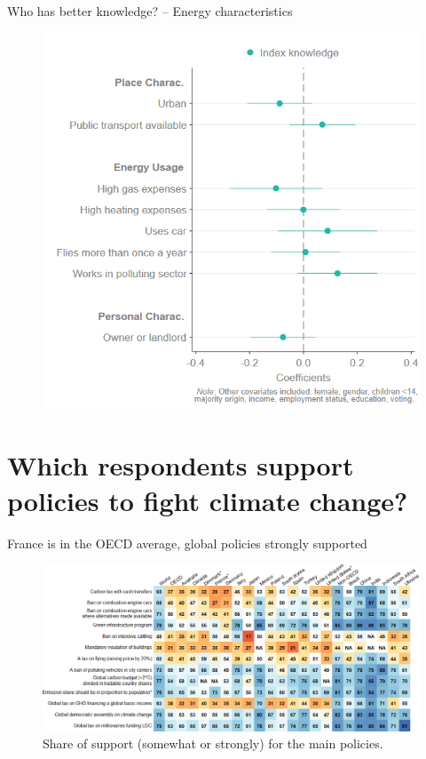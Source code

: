 \begin{framefont}{\small}
\begin{frame}{Who has better knowledge? -- Energy characteristics}
\begin{figure}
	\includegraphics[width=.5\paperwidth]{../figures/FR/Coefplot_SetAB_PlotB_index_knowledge.png}
\end{figure}
\end{frame}

\section{Which respondents support policies to fight climate change?}%

\begin{frame}{France is in the OECD average, global policies strongly supported}
	\begin{figure}[h!]
		\centering		
		\caption{Share of support (somewhat or strongly) for the main policies.}
		\includegraphics[width=\textwidth]{../figures/country_comparison/main_policies_positive_countries.png}
		\end{figure}
\end{frame}


\end{framefont}
